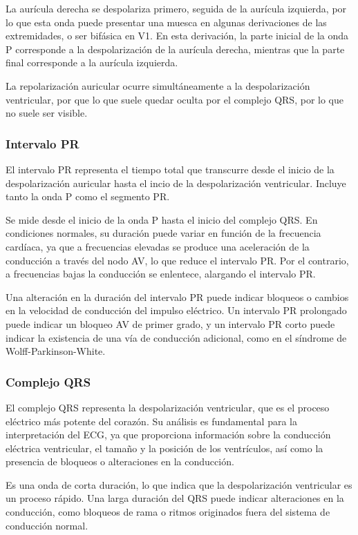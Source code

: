 \documentclass[12pt,a4paper,twoside]{book}
\begin{document}
La aurícula derecha se despolariza primero, seguida de la aurícula izquierda, por lo que esta onda puede presentar una muesca en algunas derivaciones de las extremidades, o ser bifásica en V1. 
En esta derivación, la parte inicial de la onda P corresponde a la despolarización de la aurícula derecha, mientras que la parte final corresponde a la aurícula izquierda.

La repolarización auricular ocurre simultáneamente a la despolarización ventricular, por que lo que suele quedar oculta por el complejo QRS, por lo que no suele ser visible.

\subsubsection*{Intervalo PR}

El intervalo PR representa el tiempo total que transcurre desde el inicio de la despolarización auricular hasta el incio de la despolarización ventricular. Incluye tanto la onda P como el segmento PR.

Se mide desde el inicio de la onda P hasta el inicio del complejo QRS. En condiciones normales, su duración puede variar en función de la frecuencia cardíaca, ya que a frecuencias elevadas se produce una aceleración de la conducción a través del nodo AV, lo que reduce el intervalo PR. 
Por el contrario, a frecuencias bajas la conducción se enlentece, alargando el intervalo PR.

Una alteración en la duración del intervalo PR puede indicar bloqueos o cambios en la velocidad de conducción del impulso eléctrico. Un intervalo PR prolongado puede indicar un bloqueo AV de primer grado, y un intervalo PR corto puede indicar la existencia de una vía de conducción adicional, como en el síndrome de Wolff-Parkinson-White.

\subsubsection*{Complejo QRS}

El complejo QRS representa la despolarización ventricular, que es el proceso eléctrico más potente del corazón.
Su análisis es fundamental para la interpretación del ECG, ya que proporciona información sobre la conducción eléctrica ventricular, el tamaño y la posición de los ventrículos, así como la presencia de bloqueos o alteraciones en la conducción.

Es una onda de corta duración, lo que indica que la despolarización ventricular es un proceso rápido. 
Una larga duración del QRS puede indicar alteraciones en la conducción, como bloqueos de rama o ritmos originados fuera del sistema de conducción normal.
\end{document}
